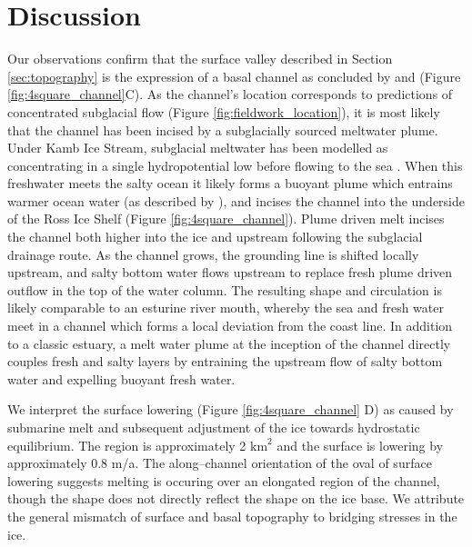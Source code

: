 \newpage


\section{Discussion} \label{sec:discussion}


\label{sec:meltwater}

Our observations confirm that the surface valley described in Section \ref{sec:topography} is the expression of a basal channel as concluded by \cite{kim2016active} and \cite{alley2016impacts} (Figure \ref{fig:4square_channel}C). 
As the channel's location corresponds to predictions of concentrated subglacial flow (Figure \ref{fig:fieldwork_location}), it is most likely that the channel has been incised by a subglacially sourced meltwater plume. Under Kamb Ice Stream, subglacial meltwater has been modelled as concentrating in a single hydropotential low before flowing to the sea \citep{carter2012supply, le2013evidence}. When this freshwater meets the salty ocean it likely forms a buoyant plume which entrains warmer ocean water (as described by \cite{sergienko2013basal}), and incises the channel into the underside of the Ross Ice Shelf (Figure \ref{fig:4square_channel}). Plume driven melt incises the channel both higher into the ice and upstream following the subglacial drainage route. As the channel grows, the grounding line is shifted locally upstream, and salty bottom water flows upstream to replace fresh plume driven outflow in the top of the water column. The resulting shape and circulation is likely comparable to an esturine river mouth, whereby the sea and fresh water meet in a channel which forms a local deviation from the coast line. In addition to a classic estuary, a melt water plume at the inception of the channel directly couples fresh and salty layers by entraining the upstream flow of salty bottom water and expelling buoyant fresh water. 



\label{sec:surface_lowering}
We interpret the surface lowering (Figure \ref{fig:4square_channel} D) as caused by submarine melt and subsequent adjustment of the ice towards hydrostatic equilibrium. The region is approximately 2 $\mathrm{km}^2$ and the surface is lowering by approximately 0.8 m/a. The along--channel orientation of the oval of surface lowering suggests melting is occuring over an elongated region of the channel, though the shape does not directly reflect the shape on the ice base. We attribute the general mismatch of surface and basal topography to bridging stresses in the ice.

